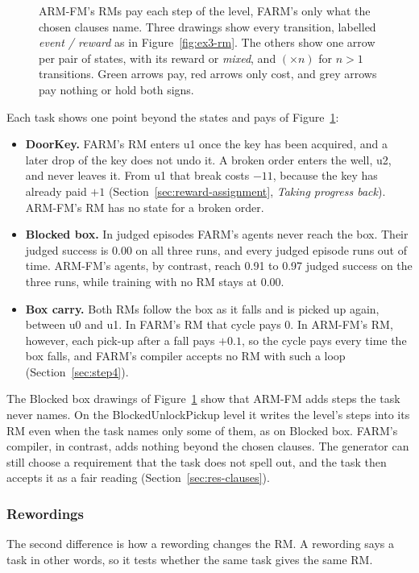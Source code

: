 \documentclass[11pt,english,listoffigures,listoftables]{tfgetsinf}
\newcommand{\gain}[1]{\textcolor{green!40!black}{\bfseries\boldmath #1}}  %
\newcommand{\loss}[1]{\textcolor{red!60!black}{\bfseries\boldmath #1}}  %
\begin{document}
\begin{figure}[!t]
\centering

\caption[Drawings of the example tasks' RMs]{ARM-FM's RMs pay each step of the level, FARM's only what the chosen clauses name. Three drawings show every transition, labelled \textit{event / reward} as in Figure~\ref{fig:ex3-rm}. The others show one arrow per pair of states, with its reward or \textit{mixed}, and $(\times n)$ for $n > 1$ transitions. Green arrows pay, red arrows only cost, and grey arrows pay nothing or hold both signs.}
\label{fig:res-ex-machines}
\end{figure}

Each task shows one point beyond the states and pays of Figure~\ref{fig:res-ex-machines}:
\begin{itemize}
    \item \textbf{DoorKey.} FARM's RM enters u1 once the key has been acquired, and a later drop of the key does not undo it. A broken order enters the well, u2, and never leaves it. From u1 that break costs \loss{$-11$}, because the key has already paid \gain{$+1$} (Section~\ref{sec:reward-assignment}, \emph{Taking progress back}). ARM-FM's RM has no state for a broken order.
    \item \textbf{Blocked box.} In judged episodes FARM's agents never reach the box. Their judged success is 0.00 on all three runs, and every judged episode runs out of time. ARM-FM's agents, by contrast, reach 0.91 to 0.97 judged success on the three runs, while training with no RM stays at 0.00.
    \item \textbf{Box carry.} Both RMs follow the box as it falls and is picked up again, between u0 and u1. In FARM's RM that cycle pays 0. In ARM-FM's RM, however, each pick-up after a fall pays \gain{$+0.1$}, so the cycle pays every time the box falls, and FARM's compiler accepts no RM with such a loop (Section~\ref{sec:step4}).
\end{itemize}

The Blocked box drawings of Figure~\ref{fig:res-ex-machines} show that ARM-FM adds steps the task never names. On the BlockedUnlockPickup level it writes the level's steps into its RM even when the task names only some of them, as on Blocked box. FARM's compiler, in contrast, adds nothing beyond the chosen clauses. The generator can still choose a requirement that the task does not spell out, and the task then accepts it as a fair reading (Section~\ref{sec:res-clauses}).

\subsubsection{Rewordings}
The second difference is how a rewording changes the RM. A rewording says a task in other words, so it tests whether the same task gives the same RM.
\end{document}

